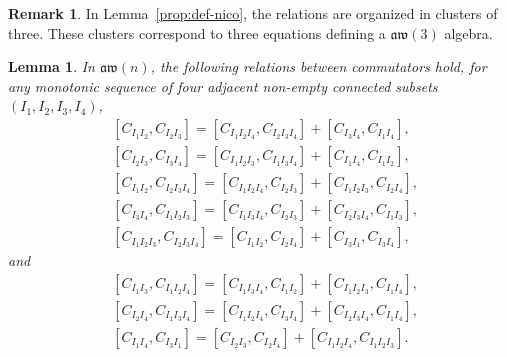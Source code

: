 \documentclass[pdftex]{sigma}
\numberwithin{equation}{section}
\newtheorem{lemm}[theo]{Lemma}
\theoremstyle{definition}
\newtheorem{rema}[theo]{Remark}
\newcommand{\aw}{\mathfrak{aw}(n)}
\begin{document}
\begin{rema}
In Lemma~\ref{prop:def-nico}, the relations are organized in clusters of three. These clusters correspond to three equations defining a $\mathfrak{aw}(3)$ algebra.
\end{rema}

\begin{lemm}\label{lem:relc1}
 In $\aw$, the following relations between commutators hold, for any monotonic sequence of four adjacent non-empty connected subsets $(I_1,I_2,I_3,I_4)$,
 \begin{align}
& [C_{I_1I_2},C_{I_2I_3} ]= [C_{I_1I_2I_4},C_{I_2I_3I_4} ]+ [C_{I_3I_4},C_{I_1I_4} ] ,
\label{eq:comut1}\\
& [C_{I_2I_3},C_{I_3I_4} ]= [C_{I_1I_2I_3},C_{I_1I_3I_4} ]+ [C_{I_1I_4},C_{I_1I_2} ] ,
\label{eq:comut2}\\
& [C_{I_1I_2} ,C_{I_2I_3I_4}]= [C_{I_1I_2I_4},C_{I_2I_3} ]+ [C_{I_1I_2I_3} ,C_{I_2I_4}] ,
\label{eq:comut3}\\
& [C_{I_3I_4} ,C_{I_1I_2I_3}]= [C_{I_1I_3I_4},C_{I_2I_3} ]+ [C_{I_2I_3I_4} ,C_{I_1I_3}] ,
\label{eq:comut4}\\
& [C_{I_1I_2I_3} ,C_{I_2I_3I_4}]= [C_{I_1I_2},C_{I_2I_4} ]+ [C_{I_3I_1} ,C_{I_3I_4}] ,
\label{eq:comut5}
 \end{align}
 and
 \begin{align}
& [C_{I_1I_3},C_{I_1I_2I_4} ]= [C_{I_1I_3I_4},C_{I_1I_2} ]+ [C_{I_1I_2I_3},C_{I_1I_4} ] ,
\label{eq:comut6}\\
& [C_{I_2I_4},C_{I_1I_3I_4} ]= [C_{I_1I_2I_4},C_{I_3I_4} ]+ [C_{I_2I_3I_4},C_{I_1I_4} ] ,
\label{eq:comut7}\\
& [C_{I_1I_4},C_{I_3I_1} ]= [C_{I_2I_3},C_{I_2I_4} ]+ [C_{I_1I_2I_4},C_{I_1I_2I_3} ] .
\label{eq:comut8}
 \end{align}
\end{lemm}
\end{document}
